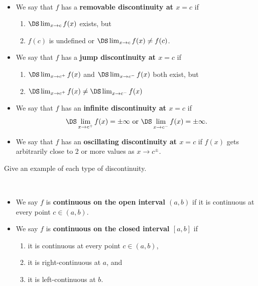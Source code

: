 \begin{definition}\,
\begin{itemize}
\item We say that $f$ has a \textbf{removable discontinuity at $x=c$} if
\begin{enumerate}
\item $\DS\lim_{x\to c}f(x)$ exists, but
\item $f(c)$ is undefined or $\DS\lim_{x\to c}f(x)\ne f(c)$.
\end{enumerate}
\item We say that $f$ has a \textbf{jump discontinuity at $x=c$} if
\begin{enumerate}
\item $\DS\lim_{x\to c^+}f(x)$ and $\DS\lim_{x\to c^-}f(x)$ both exist, but
\item $\DS\lim_{x\to c^+}f(x)\ne\DS\lim_{x\to c^-}f(x)$
\end{enumerate}
\item We say that $f$ has an \textbf{infinite discontinuity at $x=c$} if 
\begin{equation*}
\DS\lim_{x\to c^+}f(x)=\pm\infty\text{ or }\DS\lim_{x\to c^-}f(x)=\pm\infty.
\end{equation*}
\item We say that $f$ has an \textbf{oscillating discontinuity at $x=c$} if 
$f(x)$ gets arbitrarily close to 2 or more values as $x\to c^{\pm}$.
\end{itemize}
\end{definition}

\begin{example}
Give an example of each type of discontinuity.
\end{example}

\newpage

\begin{definition}\,
\begin{itemize}
\item We say $f$ is \textbf{continuous on the open interval $(a,b)$} if it is continuous at every point $c\in (a,b)$.
\item We say $f$ is \textbf{continuous on the closed interval $[a,b]$} if
\begin{enumerate}
\item it is continuous at every point $c\in (a,b)$,
\item it is right-continuous at $a$, and
\item it is left-continuous at $b$.
\end{enumerate}
\end{itemize}
\end{definition}

